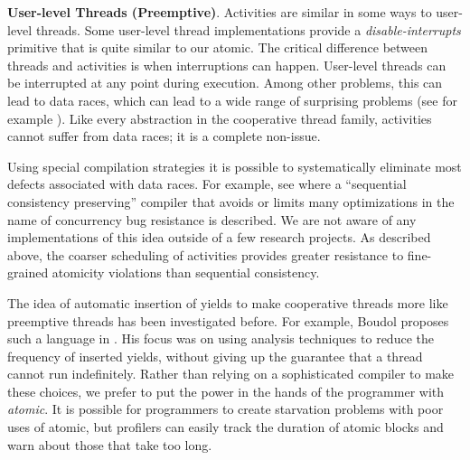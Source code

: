 \documentclass[a4paper,UKenglish,cleveref, autoref]{lipics-v2019}
\begin{document}

\textbf{User-level Threads (Preemptive)}.
Activities are similar in some ways to user-level threads.
Some user-level thread implementations provide a \emph{disable-interrupts} primitive that is quite similar to our atomic.
The critical difference between threads and activities is when interruptions can happen.
User-level threads can be interrupted at any point during execution.
Among other problems, this can lead to data races, which can lead to a wide range of surprising problems (see for example \cite{Boehm2011}).
Like every abstraction in the cooperative thread family, activities cannot suffer from data races; it is a complete non-issue.

Using special compilation strategies it is possible to systematically eliminate most defects associated with data races.
For example, see \cite{Singh2012} where a ``sequential consistency preserving'' compiler that avoids or limits many optimizations in the name of concurrency bug resistance is described.
We are not aware of any implementations of this idea outside of a few research projects.
As described above, the coarser scheduling of activities provides greater resistance to fine-grained atomicity violations than sequential consistency.

The idea of automatic insertion of yields to make cooperative threads more like preemptive threads has been investigated before.
For example, Boudol proposes such a language in \cite{Boudol2007}.
His focus was on using analysis techniques to reduce the frequency of inserted yields, without giving up the guarantee that a thread cannot run indefinitely.
Rather than relying on a sophisticated compiler to make these choices, we prefer to put the power in the hands of the programmer with \emph{atomic}.
It is possible for programmers to create starvation problems with poor uses of atomic, but profilers can easily track the duration of atomic blocks and warn about those that take too long.
\end{document}
